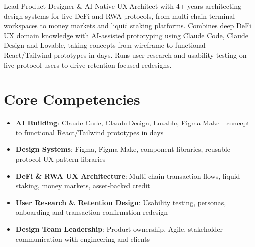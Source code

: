 \documentclass[11pt,a4paper,sans]{moderncv}
\begin{document}
\makecvtitle


\vspace{6pt}
\small{Lead Product Designer \& AI-Native UX Architect with 4+ years architecting design systems for live DeFi and RWA protocols, from multi-chain terminal workspaces to money markets and liquid staking platforms. Combines deep DeFi UX domain knowledge with AI-assisted prototyping using Claude Code, Claude Design and Lovable, taking concepts from wireframe to functional React/Tailwind prototypes in days. Runs user research and usability testing on live protocol users to drive retention-focused redesigns.}


\section{Core Competencies}
\vspace{1pt}
\begin{itemize}

\item \textbf{AI Building}: Claude Code, Claude Design, Lovable, Figma Make - concept to functional React/Tailwind prototypes in days

\item \textbf{Design Systems}: Figma, Figma Make, component libraries, reusable protocol UX pattern libraries

\item \textbf{DeFi \& RWA UX Architecture}: Multi-chain transaction flows, liquid staking, money markets, asset-backed credit

\item \textbf{User Research \& Retention Design}: Usability testing, personas, onboarding and transaction-confirmation redesign

\item \textbf{Design Team Leadership}: Product ownership, Agile, stakeholder communication with engineering and clients

\end{itemize}

\end{document}
